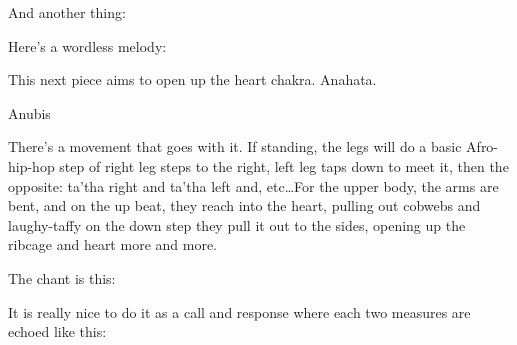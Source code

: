 \documentclass[a5paper,twoside,9pt]{extbook}
\newtheorem{I Surrender}{Definition}
\begin{document}
\begin{quote}
{%
\parindent 0pt
\noindent
\ifx\preLilyPondExample \undefined
\else
  \expandafter\preLilyPondExample
\fi
\def\lilypondbook{}%

\ifx\postLilyPondExample \undefined
\else
  \expandafter\postLilyPondExample
\fi
}
\end{quote}

And another thing:

\begin{quote}
{%
\parindent 0pt
\noindent
\ifx\preLilyPondExample \undefined
\else
  \expandafter\preLilyPondExample
\fi
\def\lilypondbook{}%

\ifx\postLilyPondExample \undefined
\else
  \expandafter\postLilyPondExample
\fi
}
\end{quote}

Here's a wordless melody:
\begin{quote}
{%
\parindent 0pt
\noindent
\ifx\preLilyPondExample \undefined
\else
  \expandafter\preLilyPondExample
\fi
\def\lilypondbook{}%

\ifx\postLilyPondExample \undefined
\else
  \expandafter\postLilyPondExample
\fi
}
\end{quote}

This next piece aims to open up the heart chakra. Anahata. 

Anubis

There's a movement that goes with it. If standing, the legs will do a basic Afro-hip-hop step of  right leg steps to the right, left leg taps down to meet it, then the opposite: ta'tha right and ta'tha left and, etc\dots For the upper body, the arms are bent, and on the up beat, they reach into the heart, pulling out cobwebs and laughy-taffy \textemdash on the down step they pull it out to the sides, opening up the ribcage and heart more and more.

The chant is this:

\begin{quote}
{%
\parindent 0pt
\noindent
\ifx\preLilyPondExample \undefined
\else
  \expandafter\preLilyPondExample
\fi
\def\lilypondbook{}%

\ifx\postLilyPondExample \undefined
\else
  \expandafter\postLilyPondExample
\fi
}
\end{quote}

It is really nice to do it as a call and response where each two measures are echoed like this:

\begin{quote}
{%
\parindent 0pt
\noindent
\ifx\preLilyPondExample \undefined
\else
  \expandafter\preLilyPondExample
\fi
\def\lilypondbook{}%

\ifx\postLilyPondExample \undefined
\else
  \expandafter\postLilyPondExample
\fi
}
\end{quote}
\end{document}
